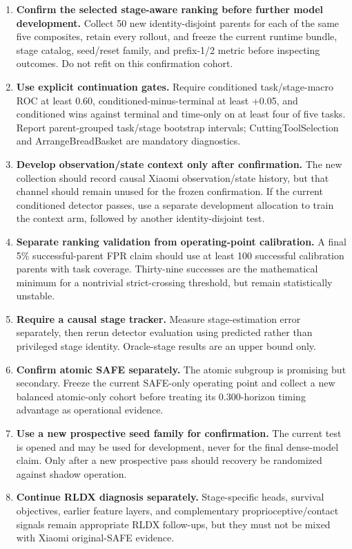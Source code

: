 \documentclass[11pt,a4paper]{article}
\begin{document}
\begin{enumerate}
\item \textbf{Confirm the selected stage-aware ranking before further model development.} Collect 50 new identity-disjoint parents for each of the same five composites, retain every rollout, and freeze the current runtime bundle, stage catalog, seed/reset family, and prefix-1/2 metric before inspecting outcomes. Do not refit on this confirmation cohort.
\item \textbf{Use explicit continuation gates.} Require conditioned task/stage-macro ROC at least 0.60, conditioned-minus-terminal at least +0.05, and conditioned wins against terminal and time-only on at least four of five tasks. Report parent-grouped task/stage bootstrap intervals; CuttingToolSelection and ArrangeBreadBasket are mandatory diagnostics.
\item \textbf{Develop observation/state context only after confirmation.} The new collection should record causal Xiaomi observation/state history, but that channel should remain unused for the frozen confirmation. If the current conditioned detector passes, use a separate development allocation to train the context arm, followed by another identity-disjoint test.
\item \textbf{Separate ranking validation from operating-point calibration.} A final 5\% successful-parent FPR claim should use at least 100 successful calibration parents with task coverage. Thirty-nine successes are the mathematical minimum for a nontrivial strict-crossing threshold, but remain statistically unstable.
\item \textbf{Require a causal stage tracker.} Measure stage-estimation error separately, then rerun detector evaluation using predicted rather than privileged stage identity. Oracle-stage results are an upper bound only.
\item \textbf{Confirm atomic SAFE separately.} The atomic subgroup is promising but secondary. Freeze the current SAFE-only operating point and collect a new balanced atomic-only cohort before treating its 0.300-horizon timing advantage as operational evidence.
\item \textbf{Use a new prospective seed family for confirmation.} The current test is opened and may be used for development, never for the final dense-model claim. Only after a new prospective pass should recovery be randomized against shadow operation.
\item \textbf{Continue RLDX diagnosis separately.} Stage-specific heads, survival objectives, earlier feature layers, and complementary proprioceptive/contact signals remain appropriate RLDX follow-ups, but they must not be mixed with Xiaomi original-SAFE evidence.
\end{enumerate}
\end{document}
